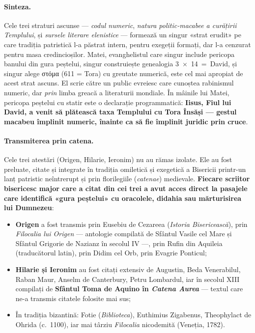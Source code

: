 \documentclass[12pt,a4paper,twoside,openany]{book}
\begin{document}
\paragraph*{Sinteza.} Cele trei straturi ascunse --- \textit{codul numeric}, \textit{natura politic-macabee a curățirii Templului}, și \textit{sursele literare elenistice} --- formează un singur «strat erudit» pe care tradiția patristică l-a păstrat intern, pentru exegeții formați, dar l-a cenzurat pentru masa credincioșilor. Matei, evanghelistul care singur include pericopa banului din gura peștelui, singur construiește genealogia 3~$\times$~14~=~David, și singur alege στόμα (611 = Tora) cu greutate numerică, este cel mai apropiat de acest strat ascuns. El scrie către un public evreiesc care cunoștea rabinismul numeric, dar \textit{prin} limba greacă a literaturii mondiale. În mâinile lui Matei, pericopa peștelui cu statir este o declarație programmatică: \textbf{Iisus, Fiul lui David, a venit să plătească taxa Templului cu Tora Însăși --- gestul macabeu împlinit numeric, înainte ca să fie împlinit juridic prin cruce}.

\paragraph*{Transmiterea prin catena.} Cele trei atestări (Origen, Hilarie, Ieronim) nu au rămas izolate. Ele au fost preluate, citate și integrate în tradiția omiletică și exegetică a Bisericii printr-un lanț patristic neîntrerupt și prin florilegiile (\textit{catenae}) medievale. \textbf{Fiecare scriitor bisericesc major care a citat din cei trei a avut acces direct la pasajele care identifică «gura peștelui» cu oracolele, didahia sau mărturisirea lui Dumnezeu}:

\begin{itemize}
\item \textbf{Origen} a fost transmis prin Eusebiu de Cezareea (\textit{Istoria Bisericească}), prin \textit{Filocalia lui Origen} --- antologie compilată de Sfântul Vasile cel Mare și Sfântul Grigorie de Nazianz în secolul IV ---, prin Rufin din Aquileia (traducătorul latin), prin Didim cel Orb, prin Evagrie Ponticul;
\item \textbf{Hilarie și Ieronim} au fost citați extensiv de Augustin, Beda Venerabilul, Raban Maur, Anselm de Canterbury, Petru Lombardul, iar în secolul XIII compilați de \textbf{Sfântul Toma de Aquino în \textit{Catena Aurea}} --- textul care ne-a transmis citatele folosite mai sus;
\item În tradiția bizantină: Fotie (\textit{Biblioteca}), Euthimius Zigabenus, Theophylact de Ohrida (c.~1100), iar mai târziu \textit{Filocalia} nicodemită (Veneția, 1782).
\end{itemize}
\end{document}
